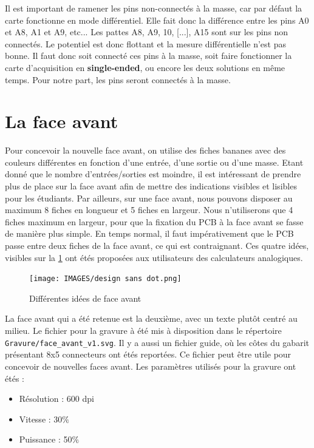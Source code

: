 \documentclass{report}
\begin{document}
Il est important de ramener les pins non-connectés à la masse, car par défaut la carte fonctionne en mode différentiel. Elle fait donc la différence entre les pins A0 et A8, A1 et A9, etc... Les pattes A8, A9, 10, [...], A15 sont sur les pins non connectés. Le potentiel est donc flottant et la mesure différentielle n'est pas bonne. Il faut donc soit connecté ces pins à la masse, soit faire fonctionner la carte d'acquisition en \textbf{single-ended}, ou encore les deux solutions en même temps. Pour notre part, les pins seront connectés à la masse.

\section{La face avant}
Pour concevoir la nouvelle face avant, on utilise des fiches bananes avec des couleurs différentes en fonction d'une entrée, d'une sortie ou d'une masse. Etant donné que le nombre d'entrées/sorties est moindre, il est intéressant de prendre plus de place sur la face avant afin de mettre des indications visibles et lisibles pour les étudiants. Par ailleurs, sur une face avant, nous pouvons disposer au maximum 8 fiches en longueur et 5 fiches en largeur. Nous n'utiliserons que 4 fiches maximum en largeur, pour que la fixation du PCB à la face avant se fasse de manière plus simple. En temps normal, il faut impérativement que le PCB passe entre deux fiches de la face avant, ce qui est contraignant. Ces quatre idées, visibles sur la  \ref{fig:design_face_avant} ont étés proposées aux utilisateurs des calculateurs analogiques.
\newpage
\begin{figure}[!h]
\begin{center}
\texttt{[image: IMAGES/design sans dot.png]} 
\caption{Différentes idées de face avant}
\label{fig:design_face_avant}
\end{center}
\end{figure}

La face avant qui a été retenue est la deuxième, avec un texte plutôt centré au milieu. Le fichier pour la gravure à été mis à disposition dans le répertoire \verb+ Gravure/face_avant_v1.svg+. Il y a aussi un fichier guide, où les côtes du gabarit présentant 8x5 connecteurs ont étés reportées. Ce fichier peut être utile pour concevoir de nouvelles faces avant. Les paramètres utilisés pour la gravure ont étés :
\begin{itemize}
\item Résolution : 600 dpi
\item Vitesse : 30$\%$
\item Puissance : 50$\%$
\end{itemize}
\end{document}

